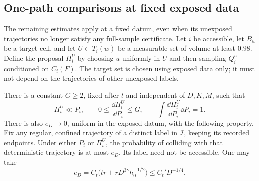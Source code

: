 \subsection{One-path comparisons at fixed exposed data}

The remaining estimates apply at a fixed datum, even when its
unexposed trajectories no longer satisfy any full-sample certificate.
Let $i$ be accessible, let $B_w$ be a target cell, and let
$U\subset T_i(w)$ be a measurable set of volume at least $0.98$.
Define the proposal $\Pi_i^U$ by choosing $u$ uniformly in $U$ and
then sampling $Q_i^u$ conditioned on $C_i(F)$.  The target set is
chosen using exposed data only; it must not depend on the trajectories
of other unexposed labels.

\begin{proposition}
\label{prop:group-comparison}
There is a constant $G\ge2$, fixed after $t$ and independent of $D,K,M$,
such that
\begin{equation}\label{group:density-bound}
 \Pi_i^U\ll P_i,\qquad
 0\le\frac{\dd\Pi_i^U}{\dd P_i}\le G,
 \qquad \int\frac{\dd\Pi_i^U}{\dd P_i}\dd P_i=1.
\end{equation}
There is also $e_D\to0$, uniform in the exposed datum, with the
following property.  Fix any regular, confined trajectory of a distinct
label in $\mathcal I$, keeping its recorded endpoints.  Under either
$P_i$ or $\Pi_i^U$, the probability of colliding with that deterministic
trajectory is at most $e_D$.  Its label need not be accessible.
One may take
\begin{equation}\label{group:eta}
 e_D=C_t\bigl(tr+rD^{3\gamma}h_0^{-1/2}\bigr)
 \le C_t' D^{-1/4}.
\end{equation}
\end{proposition}


